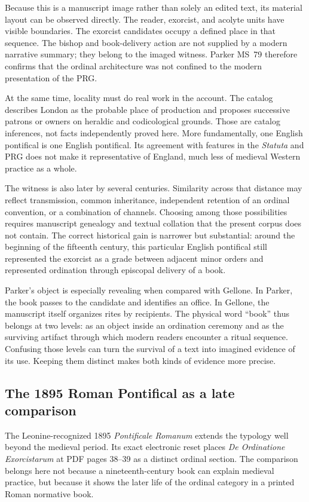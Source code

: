 Because this is a manuscript image rather than solely an edited text, its
material layout can be observed directly. The reader, exorcist, and acolyte
units have visible boundaries. The exorcist candidates occupy a defined place
in that sequence. The bishop and book-delivery action are not supplied by a
modern narrative summary; they belong to the imaged witness. Parker MS~79
therefore confirms that the ordinal architecture was not confined to the
modern presentation of the PRG.

At the same time, locality must do real work in the account. The catalog
describes London as the probable place of production and proposes successive
patrons or owners on heraldic and codicological grounds. Those are catalog
inferences, not facts independently proved here. More fundamentally, one
English pontifical is one English pontifical. Its agreement with features in
the \emph{Statuta} and PRG does not make it representative of England, much
less of medieval Western practice as a whole.

The witness is also later by several centuries. Similarity across that
distance may reflect transmission, common inheritance, independent retention
of an ordinal convention, or a combination of channels. Choosing among those
possibilities requires manuscript genealogy and textual collation that the
present corpus does not contain. The correct historical gain is narrower but
substantial: around the beginning of the fifteenth century, this particular
English pontifical still represented the exorcist as a grade between adjacent
minor orders and represented ordination through episcopal delivery of a book.

Parker's object is especially revealing when compared with Gellone. In Parker,
the book passes to the candidate and identifies an office. In Gellone, the
manuscript itself organizes rites by recipients. The physical word ``book''
thus belongs at two levels: as an object inside an ordination ceremony and as
the surviving artifact through which modern readers encounter a ritual
sequence. Confusing those levels can turn the survival of a text into imagined
evidence of its use. Keeping them distinct makes both kinds of evidence more
precise.

\subsection{The 1895 Roman Pontifical as a late comparison}

The Leonine-recognized 1895 \emph{Pontificale Romanum} extends the typology
well beyond the medieval period. Its exact electronic reset places
\emph{De Ordinatione Exorcistarum} at PDF pages 38--39 as a distinct ordinal
section. The comparison belongs here not because a nineteenth-century book
can explain medieval practice, but because it shows the later life of the
ordinal category in a printed Roman normative book.

